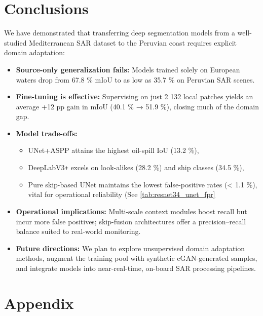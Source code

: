 \documentclass[12pt]{article}
\begin{document}
\clearpage


\section{Conclusions}

We have demonstrated that transferring deep segmentation models from a well-studied Mediterranean SAR dataset to the Peruvian coast requires explicit domain adaptation:

\begin{itemize}[leftmargin=*,label=\textbullet]
  \item \textbf{Source-only generalization fails:} Models trained solely on European waters drop from 67.8 \% mIoU to as low as 35.7 \% on Peruvian SAR scenes.
  \item \textbf{Fine-tuning is effective:} Supervising on just 2 132 local patches yields an average +12 pp gain in mIoU (40.1 \% → 51.9 \%), closing much of the domain gap.
  \item \textbf{Model trade-offs:}  
    \begin{itemize}
      \item UNet+ASPP attains the highest oil-spill IoU (13.2 \%),  
      \item DeepLabV3\texttt{+} excels on look-alikes (28.2 \%) and ship classes (34.5 \%),  
      \item Pure skip-based UNet maintains the lowest false-positive rates (< 1.1 \%), vital for operational reliability (See \ref{tab:resnet34_unet_fpr}
    \end{itemize}
  \item \textbf{Operational implications:} Multi-scale context modules boost recall but incur more false positives; skip-fusion architectures offer a precision–recall balance suited to real-world monitoring.
  \item \textbf{Future directions:} We plan to explore unsupervised domain adaptation methods, augment the training pool with synthetic cGAN-generated samples, and integrate models into near-real-time, on-board SAR processing pipelines.
\end{itemize}
\clearpage

\section{Appendix}
\end{document}
